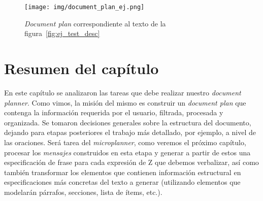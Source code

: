 \begin{figure}[H]
  	\centering
	\texttt{[image: img/document\_plan\_ej.png]}
	\caption{\textit{Document plan} correspondiente al texto de la figura~\ref{fig:ej_test_desc}}
  	\label{fig:png_document_plan_ej}
\end{figure}

\section{Resumen del capítulo}
En este capítulo se analizaron las tareas que debe realizar nuestro \emph{document planner}. Como vimos, la misión del mismo es construir un \emph{document plan} que contenga la información requerida por el usuario, filtrada, procesada y organizada. Se tomaron decisiones generales sobre la estructura del documento, dejando para etapas posteriores el trabajo más detallado, por ejemplo, a nivel de las oraciones. Será tarea del \emph{microplanner}, como veremos el próximo capítulo, procesar los \emph{mensajes} construidos en esta etapa y generar a partir de estos una especificación de frase para cada expresión de Z que debemos verbalizar, así como también transformar los elementos que contienen información estructural en especificaciones más concretas del texto a generar (utilizando elementos que modelarán párrafos, secciones, lista de ítems, etc.).
